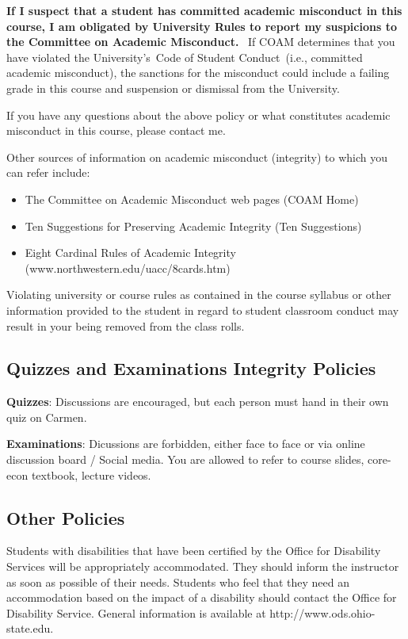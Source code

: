 \documentclass[12pt]{article}
\begin{document}
\textbf{If I suspect that a student has committed academic misconduct in this course, I am obligated by University Rules to report my suspicions to the Committee on Academic Misconduct.} 
If COAM determines that you have violated the University’s Code of Student Conduct (i.e., committed academic misconduct), the sanctions for the misconduct could include a failing grade in this course and suspension or dismissal from the University.

If you have any questions about the above policy or what constitutes academic misconduct in this course, please contact me.

Other sources of information on academic misconduct (integrity) to which you can refer include:
\begin{itemize}
    \item The Committee on Academic Misconduct web pages (COAM Home)
    \item Ten Suggestions for Preserving Academic Integrity (Ten Suggestions)
    \item Eight Cardinal Rules of Academic Integrity (www.northwestern.edu/uacc/8cards.htm)
\end{itemize}

Violating university or course rules as contained in the course syllabus or other information provided to the student in regard to student classroom conduct may result in your being removed from the class rolls.

\subsection*{Quizzes and Examinations Integrity Policies}

\textbf{Quizzes}: Discussions are encouraged, but each person must hand in their own quiz on Carmen.

\textbf{Examinations}: Dicussions are forbidden, either face to face or via online discussion board / Social media. You are allowed to refer to course slides, core-econ textbook, lecture videos.

\subsection*{Other Policies}

Students with disabilities that have been certified by the Office for Disability Services will be appropriately accommodated.
They should inform the instructor as soon as possible of their needs.
Students who feel that they need an accommodation based on the impact of a disability should contact the Office for Disability Service.
General information is available at http://www.ods.ohio-state.edu.
\end{document}
